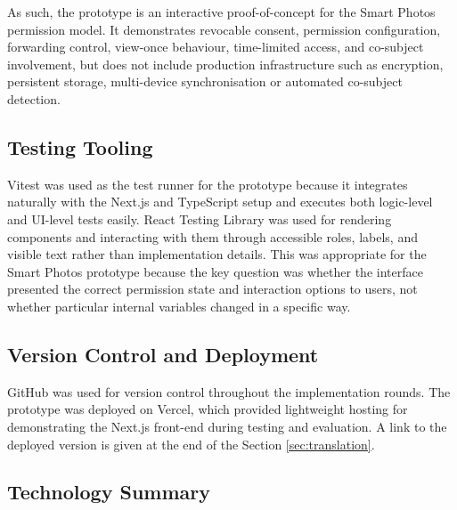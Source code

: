 As such, the prototype is an interactive proof-of-concept for the Smart Photos permission model. It demonstrates revocable consent, permission configuration, forwarding control, view-once behaviour, time-limited access, and co-subject involvement, but does not include production infrastructure such as encryption, persistent storage, multi-device synchronisation or automated co-subject detection.


\subsection*{Testing Tooling}

Vitest was used as the test runner for the prototype because it integrates naturally with the Next.js and TypeScript setup and executes both logic-level and UI-level tests easily. React Testing Library was used for rendering components and interacting with them through accessible roles, labels, and visible text rather than implementation details. This was appropriate for the Smart Photos prototype because the key question was whether the interface presented the correct permission state and interaction options to users, not whether particular internal variables changed in a specific way.



\subsection*{Version Control and Deployment}

GitHub was used for version control throughout the implementation rounds. The prototype was deployed on Vercel, which provided lightweight hosting for demonstrating the Next.js front-end during testing and evaluation. A link to the deployed version is given at the end of the Section \ref{sec:translation}.

\subsection*{Technology Summary}

